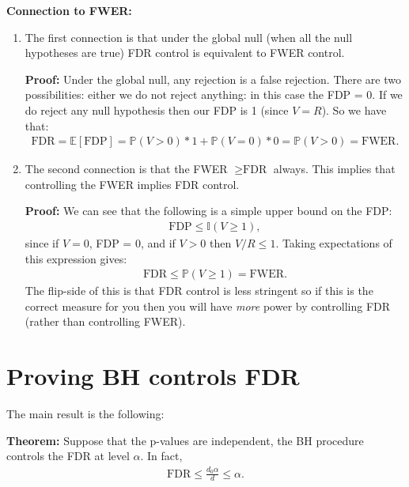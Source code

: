 \documentclass[twoside,12pt]{article}
\begin{document}
{\bf Connection to FWER: } 
\begin{enumerate}
\item The first connection is that under the global null (when all the null hypotheses are true) FDR control is equivalent to FWER control.

{\bf Proof: } Under the global null, any rejection is a false rejection. 
There are two possibilities: either we do not reject anything: in this case the FDP = 0. If we do reject any null hypothesis then our FDP is 1 (since $V = R$). So we have that:
\begin{align*}
\text{FDR} = \mathbb{E}[\text{FDP}] = \mathbb{P}(V > 0)*1 + \mathbb{P}(V = 0)*0 = \mathbb{P}(V > 0)
= \text{FWER}.
\end{align*}

\item The second connection is that the FWER $\geq \text{FDR}$ always. This implies that controlling the FWER implies FDR control. 

{\bf Proof: } We can see that the following is a simple upper bound on the FDP:
\begin{align*}
\text{FDP} \leq \mathbb{I}(V \geq 1),
\end{align*}
since if $V = 0$, FDP = 0, and if $V > 0$ then $V/R \leq 1$. Taking expectations of this expression
gives:
\begin{align*}
\text{FDR} \leq \mathbb{P}(V \geq 1) = \text{FWER}.
\end{align*}
The flip-side of this is that FDR control is less stringent so if this is the correct measure for you then you will have \emph{more} power by controlling FDR (rather than controlling FWER).
\end{enumerate}


\section{Proving BH controls FDR}
The main result is the following:

{\bf Theorem: } Suppose that the p-values are independent, the BH procedure controls the FDR at level $\alpha$. In fact,
\begin{align*}
\text{FDR} \leq \frac{d_0 \alpha}{d} \leq \alpha.
\end{align*}
\end{document}
